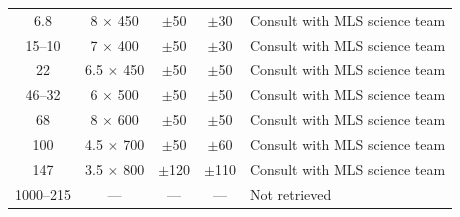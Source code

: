 \begin{table}[bp]
\begin{minipage}{\linewidth}
\begin{tabular}{ccccl}
%
6.8         & 8 $\times$ 450   & $\pm$50  & $\pm$30 & Consult with MLS science team\\
%
15--10      & 7 $\times$ 400   & $\pm$50  & $\pm$30 & Consult with MLS science team\\
%
22          & 6.5 $\times$ 450 & $\pm$50  & $\pm$50 & Consult with MLS science team\\
%        
46--32      & 6 $\times$ 500   & $\pm$50  & $\pm$50 & Consult with MLS science team\\
%
68          & 8 $\times$ 600   & $\pm$50  & $\pm$50 & Consult with MLS science team\\
%
100         & 4.5 $\times$ 700 & $\pm$50  & $\pm$60 & Consult with MLS science team\\
%
147         & 3.5 $\times$ 800 & $\pm$120 & $\pm$110 & Consult with MLS science team\\
%
1000--215   & ---              & ---      & ---      & Not retrieved\\
%
\bottomrule
\end{tabular}
  \end{minipage}
\end{table}
